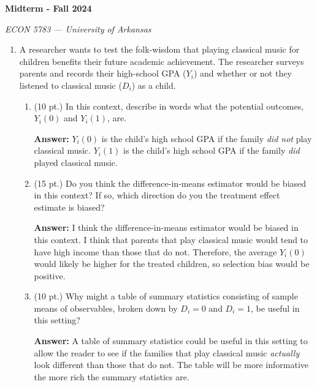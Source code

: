 \documentclass[12pt]{article}
\newcommand{\answer}[1]{{\color{blue_winged_teal}\textbf{Answer:} #1}}
\newcommand{\pts}[1]{{\color{zinc500}#1}}
\begin{document}
\begin{center}
  {\Huge\bf Midterm - Fall 2024}
  
  \smallskip
  {\large\it  ECON 5783 — University of Arkansas}
\end{center}

\medskip
\begin{enumerate}

  \item A researcher wants to test the folk-wisdom that playing classical music for children benefits their future academic achievement. The researcher surveys parents and records their high-school GPA ($Y_i$) and whether or not they listened to classical music ($D_i$) as a child.
  \begin{enumerate}
    \item \pts{(10 pt.)} In this context, describe in words what the potential outcomes, $Y_i(0)$ and $Y_i(1)$, are.
    
    \answer{
      $Y_i(0)$ is the child's high school GPA if the family \emph{did not} play classical music. $Y_i(1)$ is the child's high school GPA if the family \emph{did} played classical music. 
    }
    
    \item \pts{(15 pt.)} Do you think the difference-in-means estimator would be biased in this context? If so, which direction do you the treatment effect estimate is biased?
    
    \answer{
      I think the difference-in-means estimator would be biased in this context. I think that parents that play classical music would tend to have high income than those that do not. Therefore, the average $Y_i(0)$ would likely be higher for the treated children, so selection bias would be positive. 
    }
    
    \item \pts{(10 pt.)} Why might a table of summary statistics consisting of sample means of observables, broken down by $D_i = 0$ and $D_i = 1$, be useful in this setting?
    
    \answer{
      A table of summary statistics could be useful in this setting to allow the reader to see if the families that play classical music \emph{actually} look different than those that do not. The table will be more informative the more rich the summary statistics are.
    }
  \end{enumerate}


\end{enumerate}
\end{document}
